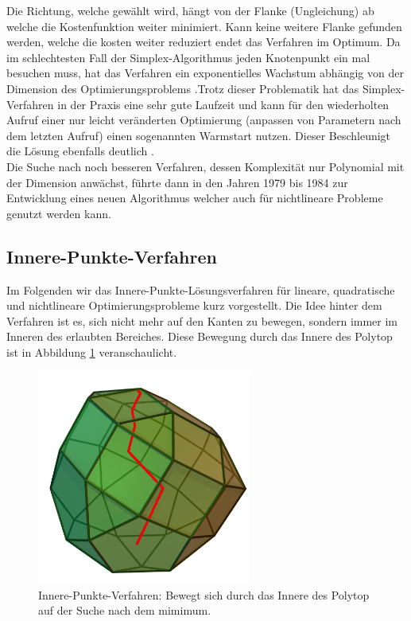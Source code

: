 \documentclass{like}
\begin{document}
Die Richtung, welche gewählt wird, hängt von der Flanke (Ungleichung) ab welche die Kostenfunktion weiter minimiert. Kann keine weitere Flanke gefunden werden, welche die kosten weiter reduziert endet das Verfahren im Optimum. Da im schlechtesten Fall der Simplex-Algorithmus jeden Knotenpunkt ein mal besuchen muss, hat das Verfahren ein exponentielles Wachstum abhängig von der Dimension des Optimierungsproblems \cite{doi:10.1137/S0036144502414942}.Trotz dieser Problematik hat das Simplex-Verfahren in der Praxis eine sehr gute Laufzeit und kann für den wiederholten Aufruf einer nur leicht veränderten Optimierung (anpassen von Parametern nach dem letzten Aufruf) einen sogenannten Warmstart nutzen. Dieser Beschleunigt die Lösung ebenfalls deutlich \cite{simplexWiki:1}.\\
Die Suche nach noch besseren Verfahren, dessen Komplexität nur Polynomial mit der Dimension anwächst, führte dann in den Jahren 1979 bis 1984 zur Entwicklung eines neuen Algorithmus welcher auch für nichtlineare Probleme genutzt werden kann.

\subsection{Innere-Punkte-Verfahren} 
\label{ipm} 
Im Folgenden wir das Innere-Punkte-Lösungsverfahren für lineare, quadratische und nichtlineare Optimierungsprobleme kurz vorgestellt. Die Idee hinter dem Verfahren ist es, sich nicht mehr auf den Kanten zu bewegen, sondern immer im Inneren des erlaubten Bereiches. Diese Bewegung durch das Innere des Polytop ist in Abbildung \ref{fig:iterPointMethod} veranschaulicht.  
\begin{figure}[ht!]
	\centering
	\includegraphics[width=200pt]{Abbildungen/iterPointMethod.png}
	\caption{Innere-Punkte-Verfahren: Bewegt sich durch das Innere des Polytop auf der Suche nach dem mimimum.}
	\label{fig:iterPointMethod}
\end{figure}
\end{document}
